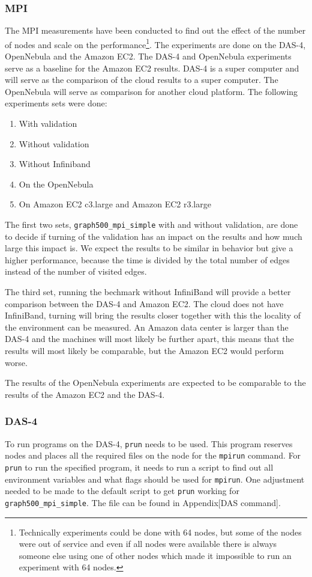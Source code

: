 \subsubsection{MPI}
The MPI measurements have been conducted to find out the effect of the number of nodes and scale on the performance\footnote{Technically experiments could be done with 64 nodes, but some of the nodes were out of service and even if all nodes were available there is always someone else using one of other nodes which made it impossible to run an experiment with 64 nodes.}.
The experiments are done on the DAS-4, OpenNebula and the Amazon EC2. The DAS-4 and OpenNebula experiments serve as a baseline for the Amazon EC2 results. DAS-4 is a super computer and will serve as the comparison of the cloud results to a super computer. The OpenNebula will serve as comparison for another cloud platform. The following experiments sets were done:
\begin{enumerate}
	\item With validation
	\item Without validation
	\item Without Infiniband
	\item On the OpenNebula
	\item On Amazon EC2 c3.large and Amazon EC2 r3.large 
\end{enumerate}

The first two sets, \texttt{graph500\_mpi\_simple} with and without validation, are done to decide if turning of the validation has an impact on the results and how much large this impact is. We expect the results to be similar in behavior but give a higher performance, because the time is divided by the total number of edges instead of the number of visited edges.

The third set, running the bechmark without InfiniBand will provide a better comparison between the DAS-4 and Amazon EC2. The cloud does not have InfiniBand, turning will bring the results closer together with this the locality of the environment can be measured. An Amazon data center is larger than the DAS-4 and the machines will most likely be further apart, this means that the results will most likely be comparable, but the Amazon EC2 would perform worse.

The results of the OpenNebula experiments are expected to be comparable to the results of the Amazon EC2 and the DAS-4.  

\subsubsection*{DAS-4}
To run programs on the DAS-4, \texttt{prun} needs to be used. This program reserves nodes and places all the required files on the node for the \texttt{mpirun} command. For \texttt{prun} to run the specified program, it needs to run a script to find out all environment variables and what flags should be used for \texttt{mpirun}. One adjustment needed to be made to the default script to get \texttt{prun} working for \texttt{graph500\_mpi\_simple}. The file can be found in Appendix[DAS command].

